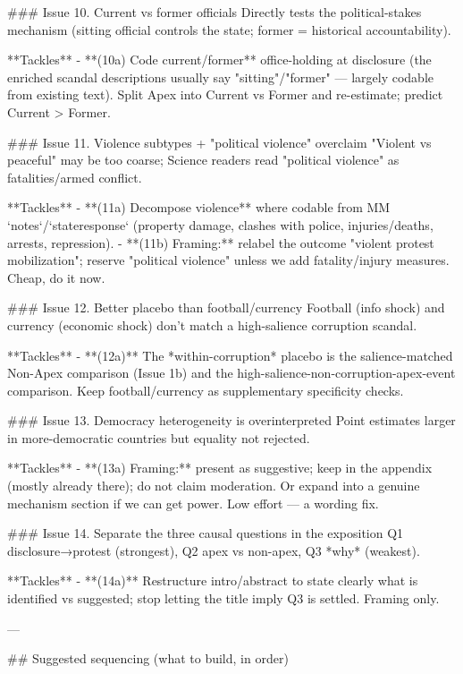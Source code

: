 ### Issue 10. Current vs former officials
Directly tests the political-stakes mechanism (sitting official controls the
state; former = historical accountability).

**Tackles**
- **(10a) Code current/former** office-holding at disclosure (the enriched
  scandal descriptions usually say "sitting"/"former" — largely codable from
  existing text). Split Apex into Current vs Former and re-estimate; predict
  Current > Former.

### Issue 11. Violence subtypes + "political violence" overclaim
"Violent vs peaceful" may be too coarse; Science readers read "political
violence" as fatalities/armed conflict.

**Tackles**
- **(11a) Decompose violence** where codable from MM `notes`/`stateresponse`
  (property damage, clashes with police, injuries/deaths, arrests, repression).
- **(11b) Framing:** relabel the outcome "violent protest mobilization"; reserve
  "political violence" unless we add fatality/injury measures. Cheap, do it now.

### Issue 12. Better placebo than football/currency
Football (info shock) and currency (economic shock) don't match a high-salience
corruption scandal.

**Tackles**
- **(12a)** The *within-corruption* placebo is the salience-matched Non-Apex
  comparison (Issue 1b) and the high-salience-non-corruption-apex-event
  comparison. Keep football/currency as supplementary specificity checks.

### Issue 13. Democracy heterogeneity is overinterpreted
Point estimates larger in more-democratic countries but equality not rejected.

**Tackles**
- **(13a) Framing:** present as suggestive; keep in the appendix (mostly already
  there); do not claim moderation. Or expand into a genuine mechanism section if
  we can get power. Low effort — a wording fix.

### Issue 14. Separate the three causal questions in the exposition
Q1 disclosure→protest (strongest), Q2 apex vs non-apex, Q3 *why* (weakest).

**Tackles**
- **(14a)** Restructure intro/abstract to state clearly what is identified vs
  suggested; stop letting the title imply Q3 is settled. Framing only.

---

## Suggested sequencing (what to build, in order)

